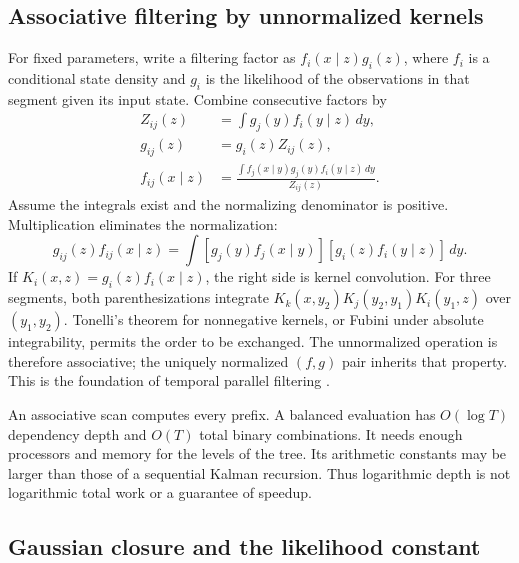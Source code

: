 \subsection{Associative filtering by unnormalized kernels}

For fixed parameters, write a filtering factor as
$f_i(x\mid z)g_i(z)$, where $f_i$ is a conditional state density and $g_i$
is the likelihood of the observations in that segment given its input state.
Combine consecutive factors by
\begin{align}
 Z_{ij}(z)&=\int g_j(y)f_i(y\mid z)\,dy,\\
 g_{ij}(z)&=g_i(z)Z_{ij}(z),\\
 f_{ij}(x\mid z)&=
  \frac{\int f_j(x\mid y)g_j(y)f_i(y\mid z)\,dy}{Z_{ij}(z)}.
 \label{eq:bf-modern-parallel-composition}
\end{align}
Assume the integrals exist and the normalizing denominator is positive.
Multiplication eliminates the normalization:
\begin{equation}
 g_{ij}(z)f_{ij}(x\mid z)
   =\int[g_j(y)f_j(x\mid y)][g_i(z)f_i(y\mid z)]\,dy.
 \label{eq:bf-modern-parallel-kernel}
\end{equation}
If $K_i(x,z)=g_i(z)f_i(x\mid z)$, the right side is kernel convolution.
For three segments, both parenthesizations integrate
$K_k(x,y_2)K_j(y_2,y_1)K_i(y_1,z)$ over $(y_1,y_2)$. Tonelli's theorem for
nonnegative kernels, or Fubini under absolute integrability, permits the
order to be exchanged. The unnormalized operation is therefore associative;
the uniquely normalized $(f,g)$ pair inherits that property. This is the
foundation of temporal parallel filtering
\citep[Definition 2 and Theorem 3]{sarkka2020parallel}.

An associative scan computes every prefix. A balanced evaluation has
$O(\log T)$ dependency depth and $O(T)$ total binary combinations. It needs
enough processors and memory for the levels of the tree. Its arithmetic
constants may be larger than those of a sequential Kalman recursion. Thus
logarithmic depth is not logarithmic total work or a guarantee of speedup.

\subsection{Gaussian closure and the likelihood constant}

